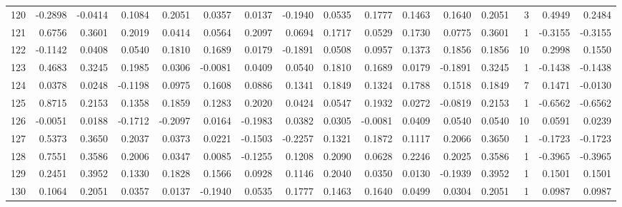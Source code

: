 \begin{tabular}{lrrrrrrrrrrrrrrr}
120 &     -0.2898 & -0.0414 &  0.1084 &  0.2051 &  0.0357 &  0.0137 & -0.1940 &  0.0535 &  0.1777 &  0.1463 &   0.1640 &     0.2051 &      3 &                    0.4949 &                     0.2484 \\
121 &      0.6756 &  0.3601 &  0.2019 &  0.0414 &  0.0564 &  0.2097 &  0.0694 &  0.1717 &  0.0529 &  0.1730 &   0.0775 &     0.3601 &      1 &                   -0.3155 &                    -0.3155 \\
122 &     -0.1142 &  0.0408 &  0.0540 &  0.1810 &  0.1689 &  0.0179 & -0.1891 &  0.0508 &  0.0957 &  0.1373 &   0.1856 &     0.1856 &     10 &                    0.2998 &                     0.1550 \\
123 &      0.4683 &  0.3245 &  0.1985 &  0.0306 & -0.0081 &  0.0409 &  0.0540 &  0.1810 &  0.1689 &  0.0179 &  -0.1891 &     0.3245 &      1 &                   -0.1438 &                    -0.1438 \\
124 &      0.0378 &  0.0248 & -0.1198 &  0.0975 &  0.1608 &  0.0886 &  0.1341 &  0.1849 &  0.1324 &  0.1788 &   0.1518 &     0.1849 &      7 &                    0.1471 &                    -0.0130 \\
125 &      0.8715 &  0.2153 &  0.1358 &  0.1859 &  0.1283 &  0.2020 &  0.0424 &  0.0547 &  0.1932 &  0.0272 &  -0.0819 &     0.2153 &      1 &                   -0.6562 &                    -0.6562 \\
126 &     -0.0051 &  0.0188 & -0.1712 & -0.2097 &  0.0164 & -0.1983 &  0.0382 &  0.0305 & -0.0081 &  0.0409 &   0.0540 &     0.0540 &     10 &                    0.0591 &                     0.0239 \\
127 &      0.5373 &  0.3650 &  0.2037 &  0.0373 &  0.0221 & -0.1503 & -0.2257 &  0.1321 &  0.1872 &  0.1117 &   0.2066 &     0.3650 &      1 &                   -0.1723 &                    -0.1723 \\
128 &      0.7551 &  0.3586 &  0.2006 &  0.0347 &  0.0085 & -0.1255 &  0.1208 &  0.2090 &  0.0628 &  0.2246 &   0.2025 &     0.3586 &      1 &                   -0.3965 &                    -0.3965 \\
129 &      0.2451 &  0.3952 &  0.1330 &  0.1828 &  0.1566 &  0.0928 &  0.1146 &  0.2040 &  0.0350 &  0.0130 &  -0.1939 &     0.3952 &      1 &                    0.1501 &                     0.1501 \\
130 &      0.1064 &  0.2051 &  0.0357 &  0.0137 & -0.1940 &  0.0535 &  0.1777 &  0.1463 &  0.1640 &  0.0499 &   0.0304 &     0.2051 &      1 &                    0.0987 &                     0.0987 \\

\end{tabular}
